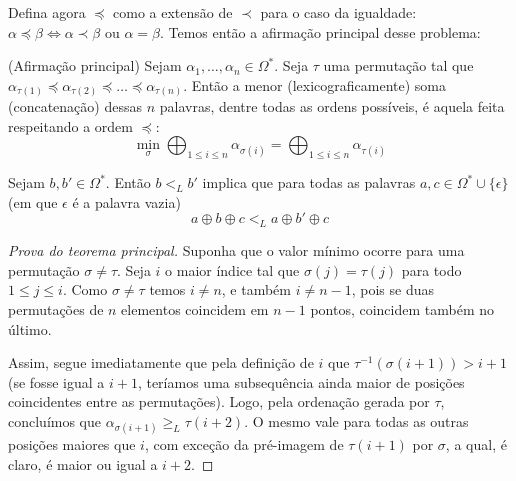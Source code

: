 \documentclass{article}
\begin{document}
\begin{solutionenv}
    Defina agora \(\preceq\) como a extensão de \(\prec\) para o caso da igualdade: \(\alpha \preceq \beta \iff \alpha \prec \beta\) ou \(\alpha = \beta\). Temos então a afirmação principal desse problema:
    \begin{theorem}
        (Afirmação principal)
        Sejam \(\alpha_1, \dots, \alpha_n \in \Omega^*\). Seja \(\tau\) uma permutação tal que \(\alpha_{\tau(1)} \preceq \alpha_{\tau(2)} \preceq \dotsc \preceq \alpha_{\tau(n)}\). Então a menor (lexicograficamente) soma (concatenação) dessas \(n\) palavras, dentre todas as ordens possíveis, é aquela feita respeitando a ordem \(\preceq\): 
        \[\min_{\sigma}\bigoplus_{1 \leq i \leq n}\alpha_{\sigma(i)} = \bigoplus_{1 \leq i \leq n}\alpha_{\tau(i)}\]
    \end{theorem}
    \begin{lemma}\label{mid-component}
    Sejam \(b, b' \in \Omega^*\). Então \(b <_L b'\) implica que para todas as palavras \(a, c \in \Omega^* \cup \{\epsilon\}\) (em que \(\epsilon\) é a palavra vazia)
    \[a \oplus b \oplus c <_L a \oplus b' \oplus c\]        
    \end{lemma}

    \begin{proof}[Prova do teorema principal]
        Suponha que o valor mínimo ocorre para uma permutação \(\sigma \neq \tau\). Seja \(i\) o maior índice tal que \(\sigma(j) = \tau(j)\) para todo \(1 \leq j \leq i\). Como \(\sigma \neq \tau\) temos \(i \neq n\), e também \(i \neq n-1\), pois se duas permutações de \(n\) elementos coincidem em \(n-1\) pontos, coincidem também no último.

        Assim, segue imediatamente que pela definição de \(i\) que \(\tau^{-1}(\sigma(i + 1)) > i + 1\) (se fosse igual a \(i+1\), teríamos uma subsequência ainda maior de posições coincidentes entre as permutações). Logo, pela ordenação gerada por \(\tau\), concluímos que \(\alpha_{\sigma(i + 1)} \geq_L \tau(i + 2)\). O mesmo vale para todas as outras posições maiores que \(i\), com exceção da pré-imagem de \(\tau(i + 1)\) por \(\sigma\), a qual, é claro, é maior ou igual a \(i + 2\). 


\end{proof}
\end{solutionenv}
\end{document}
